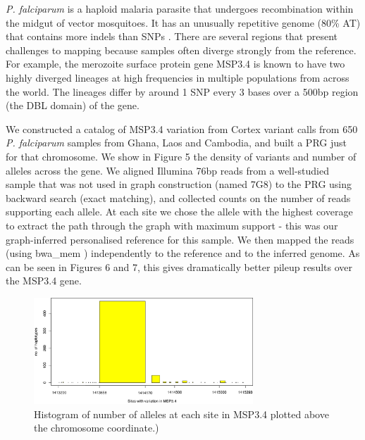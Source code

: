 \documentclass[runningheads,a4paper]{llncs}
\begin{document}
\textit{P. falciparum} is a haploid malaria parasite that undergoes recombination within the midgut of vector mosquitoes. It has an unusually repetitive genome (80\% AT) that contains more indels than SNPs \cite{miles}. There are several regions that present challenges to mapping because samples often diverge strongly from the reference. For example, the merozoite surface protein gene MSP3.4 is known to have two highly diverged lineages at high frequencies in multiple populations from across the world.  The lineages differ by around 1 SNP every 3 bases over a 500bp region (the DBL domain) of the gene.

We constructed a catalog of MSP3.4 variation from Cortex \cite{iqbal} variant calls from 650 \textit{P. falciparum} samples from Ghana, Laos and Cambodia, and built a PRG just for that chromosome. We show in Figure 5 the density of variants and number of alleles across the gene. We aligned Illumina 76bp reads from a well-studied sample that was not used in graph construction (named 7G8) to the PRG using backward search (exact matching), and collected counts on the number of reads supporting each allele. At each site we chose the allele with the highest coverage to extract the path through the graph with maximum support - this was our graph-inferred personalised reference for this sample. We then mapped the reads (using bwa\_mem \cite{hengli}) independently to the reference and to the inferred genome. As can be seen in Figures 6 and 7, this gives dramatically better pileup results over the MSP3.4 gene.

\begin{figure}
\centering
\includegraphics[height=4cm]{PRG.png}
\caption{Histogram of number of alleles at each site in MSP3.4 plotted above the chromosome coordinate.)}
\label{fig:example}
\end{figure}
\end{document}
